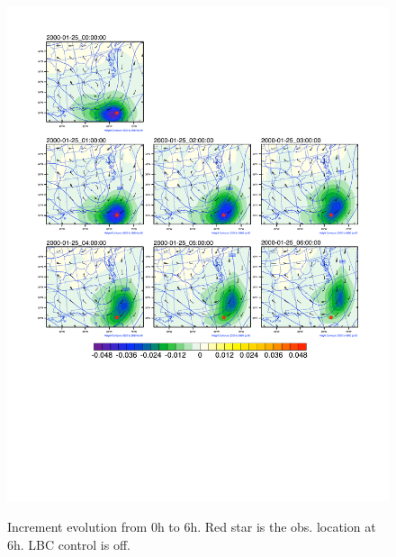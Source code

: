 \documentclass[12pt]{article}
\begin{document}
\begin{figure}[t]
  \noindent\includegraphics[width=45pc,trim=10 200 10 10, clip, angle=0]{boundarynolbcjcdf.pdf}\\
  \caption{Increment evolution from 0h to 6h. Red star is the obs. location at 6h. LBC control is off.}\label{f3}
\end{figure}
\end{document}
